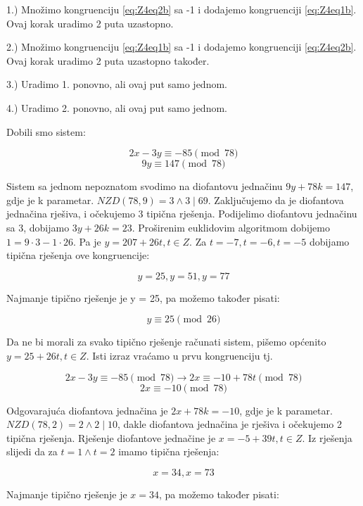 \documentclass[12pt]{article}
\begin{document}
\begin{center}
1.) Množimo kongruenciju \ref{eq:Z4eq2b} sa -1 i dodajemo kongruenciji \ref{eq:Z4eq1b}. Ovaj korak uradimo 2 puta uzastopno.


2.) Množimo kongruenciju \ref{eq:Z4eq1b} sa -1 i dodajemo kongruenciji \ref{eq:Z4eq2b}. Ovaj korak uradimo 2 puta uzastopno također.


3.) Uradimo 1. ponovno, ali ovaj put samo jednom.


4.) Uradimo 2. ponovno, ali ovaj put samo jednom.
\end{center}

Dobili smo sistem:

$$2x - 3y \equiv -85 \pmod{78}$$
$$9y \equiv 147 \pmod{78}$$\vspace{1mm}

Sistem sa jednom nepoznatom svodimo na diofantovu jednačinu $9y + 78k = 147$, gdje je k parametar. $NZD(78, 9) = 3 \land 3 \mid 69$. Zaključujemo da je diofantova jednačina rješiva, i očekujemo 3 tipična rješenja. Podijelimo diofantovu jednačinu sa 3, dobijamo $3y + 26k = 23$. Proširenim euklidovim algoritmom dobijemo $1 = 9 \cdot 3 - 1 \cdot 26$. Pa je $y = 207 + 26t, t \in Z$. Za $t = -7, t = -6, t = -5$ dobijamo tipična rješenja ove kongruencije:

$$y = 25, y = 51, y = 77$$\vspace{1mm}

Najmanje tipično rješenje je y = 25, pa možemo također pisati:

$$y \equiv 25 \pmod{26}$$ \vspace{1mm}

Da ne bi morali za svako tipično rješenje računati sistem, pišemo općenito $y = 25 + 26t, t \in Z$. Isti izraz vraćamo u prvu kongruenciju tj.

$$2x - 3y \equiv -85 \pmod{78} \to 2x \equiv -10 + 78t \pmod{78}$$
$$2x \equiv -10 \pmod{78}$$\vspace{1mm}

Odgovarajuća diofantova jednačina je $2x + 78k = -10$, gdje je k parametar. $NZD(78, 2) = 2 \land 2 \mid 10$, dakle diofantova jednačina je rješiva i očekujemo 2 tipična rješenja. Rješenje diofantove jednačine je $x = -5 + 39t, t \in Z$. Iz rješenja slijedi da za $t = 1 \land t = 2$ imamo tipična rješenja:

$$x = 34, x = 73$$\vspace{1mm}

Najmanje tipično rješenje je $x = 34$, pa možemo također pisati:
\end{document}
